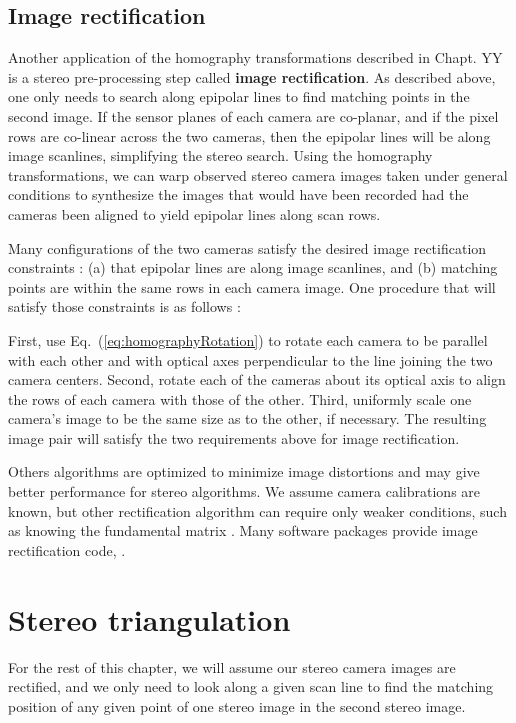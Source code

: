 \subsection{Image rectification}
Another application of the homography transformations described in Chapt. YY is a stereo pre-processing step called {\bf image rectification}.  As described above, one only needs to search along epipolar lines to find matching points in the second image.  If the sensor planes of each camera are co-planar, and if the pixel rows are co-linear across the two cameras, then the epipolar lines will be along image scanlines, simplifying the stereo search.  Using the homography transformations, we can warp observed stereo camera images taken under general conditions to synthesize the images that would have been recorded had the cameras been aligned to yield epipolar lines along scan rows.

Many configurations of the two cameras satisfy the desired image rectification constraints \cite{Zhang2003}: (a) that epipolar lines are along image scanlines, and (b) matching points are within the same rows in each camera image.  One procedure that will satisfy those constraints is as follows \cite{wikiRectification}:  

First, use Eq.~(\ref{eq:homographyRotation}) to rotate each camera to be parallel with each other and with optical axes perpendicular to the line joining the two camera centers.  Second, rotate each of the cameras about its optical axis to align the rows of each camera with those of the other.  Third, uniformly scale one camera's image to be the same size as to the other, if necessary.  The resulting image pair will satisfy the two requirements above for image rectification.

Others algorithms are optimized to minimize image distortions \cite{Zhang2003} and may give better performance for stereo algorithms.  We assume camera calibrations are known, but other rectification algorithm can require only weaker conditions, such as knowing the fundamental matrix \cite{Hartley2004,Pollefeys99}. Many software packages provide image rectification code, \cite{github2022}.




\section{Stereo triangulation}

For the rest of this chapter, we will assume our stereo camera images are rectified, and we only need to look along a given scan line to find the matching position of any given point of one stereo image in the second stereo image.


